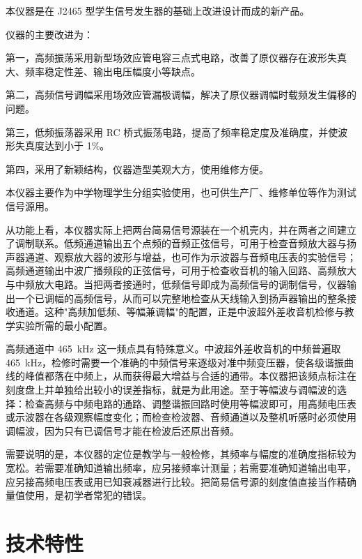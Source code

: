 \documentclass[12pt,UTF8]{ctexbook}
\begin{document}
本仪器是在 J2465 型学生信号发生器的基础上改进设计而成的新产品。

仪器的主要改进为：

第一，高频振荡采用新型场效应管电容三点式电路，改善了原仪器存在波形失真大、频率稳定性差、输出电压幅度小等缺点。

第二，高频信号调幅采用场效应管漏极调幅，解决了原仪器调幅时载频发生偏移的问题。

第三，低频振荡器采用 RC 桥式振荡电路，提高了频率稳定度及准确度，并使波形失真度达到小于 1\%。

第四，采用了新颖结构，仪器造型美观大方，使用维修方便。

本仪器主要作为中学物理学生分组实验使用，也可供生产厂、维修单位等作为测试信号源用。

从功能上看，本仪器实际上把两台简易信号源装在一个机壳内，并在两者之间建立了调制联系。低频通道输出五个点频的音频正弦信号，可用于检查音频放大器与扬声器通道、观察放大器的波形与增益，也可作为示波器与音频电压表的实验信号；高频通道输出中波广播频段的正弦信号，可用于检查收音机的输入回路、高频放大与中频放大电路。当把两者接通时，低频信号即成为高频信号的调制信号，仪器输出一个已调幅的高频信号，从而可以完整地检查从天线输入到扬声器输出的整条接收通道。这种"高频加低频、等幅兼调幅"的配置，正是中波超外差收音机检修与教学实验所需的最小配置。

高频通道中 465~kHz 这一频点具有特殊意义。中波超外差收音机的中频普遍取 465~kHz，检修时需要一个准确的中频信号来逐级对准中频变压器，使各级谐振曲线的峰值都落在中频上，从而获得最大增益与合适的通带。本仪器把该频点标注在刻度盘上并单独给出较小的误差指标，就是为此用途。至于等幅波与调幅波的选择：检查高频与中频电路的通路、调整谐振回路时使用等幅波即可，用高频电压表或示波器在各级观察幅度变化；而检查检波器、音频通道以及整机听感时必须使用调幅波，因为只有已调信号才能在检波后还原出音频。

需要说明的是，本仪器的定位是教学与一般检修，其频率与幅度的准确度指标较为宽松。若需要准确知道输出频率，应另接频率计测量；若需要准确知道输出电平，应另接高频电压表或用已知衰减器进行比较。把简易信号源的刻度值直接当作精确量值使用，是初学者常犯的错误。

\section{技术特性}
\end{document}
